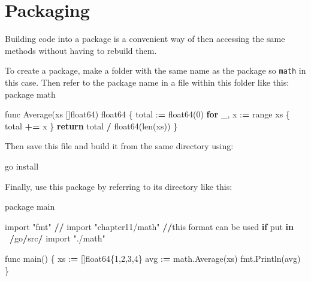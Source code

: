 \documentclass[]{book}
\newenvironment{Shaded}{\begin{snugshade}}{\end{snugshade}}
\newcommand{\KeywordTok}[1]{\textcolor[rgb]{0.13,0.29,0.53}{\textbf{#1}}}
\newcommand{\DecValTok}[1]{\textcolor[rgb]{0.00,0.00,0.81}{#1}}
\newcommand{\StringTok}[1]{\textcolor[rgb]{0.31,0.60,0.02}{#1}}
\newcommand{\ImportTok}[1]{#1}
\newcommand{\ControlFlowTok}[1]{\textcolor[rgb]{0.13,0.29,0.53}{\textbf{#1}}}
\newcommand{\OperatorTok}[1]{\textcolor[rgb]{0.81,0.36,0.00}{\textbf{#1}}}
\newcommand{\BuiltInTok}[1]{#1}
\newcommand{\NormalTok}[1]{#1}
\begin{document}
\section{Packaging}\label{packaging}

Building code into a package is a convenient way of then accessing the
same methods without having to rebuild them.

To create a package, make a folder with the same name as the package so
\texttt{math} in this case. Then refer to the package name in a file
within this folder like this: package math

\begin{Shaded}
\begin{Highlighting}[]
\NormalTok{func Average(xs []float64) float64 \{}
\NormalTok{    total :}\OperatorTok{=}\NormalTok{ float64(}\DecValTok{0}\NormalTok{)             }
    \ControlFlowTok{for}\NormalTok{ _, x :}\OperatorTok{=} \BuiltInTok{range}\NormalTok{ xs \{          }
\NormalTok{        total }\OperatorTok{+=}\NormalTok{ x                  }
\NormalTok{    \}                               }
    \ControlFlowTok{return}\NormalTok{ total }\OperatorTok{/}\NormalTok{ float64(}\BuiltInTok{len}\NormalTok{(xs)) }
\NormalTok{\}                                   }
\end{Highlighting}
\end{Shaded}

Then save this file and build it from the same directory using:

\begin{Shaded}
\begin{Highlighting}[]
\NormalTok{go install}
\end{Highlighting}
\end{Shaded}

Finally, use this package by referring to its directory like this:

\begin{Shaded}
\begin{Highlighting}[]
\NormalTok{package main                          }
                                      
\ImportTok{import} \StringTok{"fmt"}                          
\OperatorTok{//} \ImportTok{import} \StringTok{"chapter11/math"} \OperatorTok{//}\NormalTok{this }\BuiltInTok{format}\NormalTok{ can be used }\ControlFlowTok{if}\NormalTok{ put }\KeywordTok{in} \OperatorTok{~/}\NormalTok{go}\OperatorTok{/}\NormalTok{src}\OperatorTok{/}
\ImportTok{import} \StringTok{"./math"}                       
                                      
\NormalTok{func main() \{                         }
\NormalTok{    xs :}\OperatorTok{=}\NormalTok{ []float64\{}\DecValTok{1}\NormalTok{,}\DecValTok{2}\NormalTok{,}\DecValTok{3}\NormalTok{,}\DecValTok{4}\NormalTok{\}          }
\NormalTok{    avg :}\OperatorTok{=}\NormalTok{ math.Average(xs)           }
\NormalTok{    fmt.Println(avg)                  }
\NormalTok{\}                                     }
\end{Highlighting}
\end{Shaded}
\end{document}
